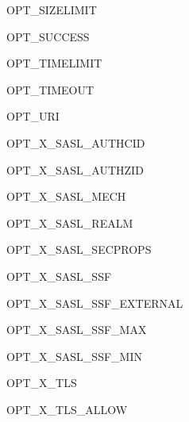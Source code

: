 \begin{datadesc}{OPT_SIZELIMIT}
\end{datadesc}

\begin{datadesc}{OPT_SUCCESS}
\end{datadesc}

\begin{datadesc}{OPT_TIMELIMIT}
\end{datadesc}

\begin{datadesc}{OPT_TIMEOUT}
\end{datadesc}

\begin{datadesc}{OPT_URI}
\end{datadesc}

\begin{datadesc}{OPT_X_SASL_AUTHCID}
\end{datadesc}

\begin{datadesc}{OPT_X_SASL_AUTHZID}
\end{datadesc}

\begin{datadesc}{OPT_X_SASL_MECH}
\end{datadesc}

\begin{datadesc}{OPT_X_SASL_REALM}
\end{datadesc}

\begin{datadesc}{OPT_X_SASL_SECPROPS}
\end{datadesc}

\begin{datadesc}{OPT_X_SASL_SSF}
\end{datadesc}

\begin{datadesc}{OPT_X_SASL_SSF_EXTERNAL}
\end{datadesc}

\begin{datadesc}{OPT_X_SASL_SSF_MAX}
\end{datadesc}

\begin{datadesc}{OPT_X_SASL_SSF_MIN}
\end{datadesc}

\begin{datadesc}{OPT_X_TLS}
\end{datadesc}

\begin{datadesc}{OPT_X_TLS_ALLOW}
\end{datadesc}

